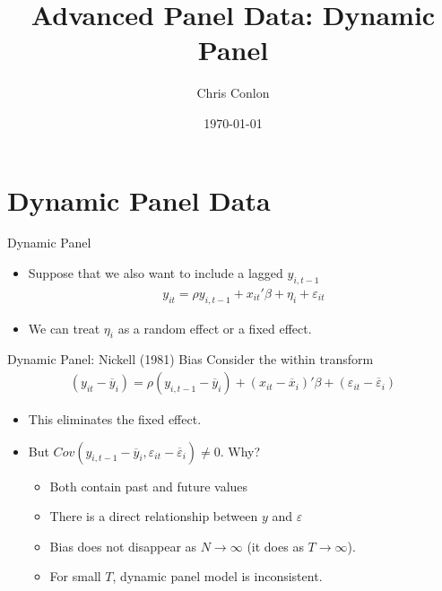 \documentclass[xcolor=pdftex,dvipsnames,table,mathserif,aspectratio=169]{beamer}
\title{Advanced Panel Data: Dynamic Panel}
\author{Chris Conlon }
\institute{NYU Stern }
\date{\today}
\begin{document}
\maketitle




\section*{Dynamic Panel Data}

\begin{frame}{Dynamic Panel}
\begin{itemize}
\item Suppose that we also want to include a lagged $y_{i,t-1}$
\begin{eqnarray*}
y_{it} = \rho y_{i,t-1} + x_{it}'\beta + \eta_i + \varepsilon_{it}
\end{eqnarray*}
\item We can treat $\eta_i$ as a \alert{random effect} or a \alert{fixed effect}.
\end{itemize}
\end{frame}

\begin{frame}{Dynamic Panel: Nickell (1981) Bias}
Consider the within transform
\begin{eqnarray*}
(y_{it}-\overline{y}_i) = \rho (y_{i,t-1}-\overline{y}_i) + (x_{it}-\overline{x}_i)'\beta +( \varepsilon_{it}- \overline{\varepsilon}_{i})
\end{eqnarray*}
\begin{itemize}
\item This eliminates the fixed effect.
\item But $Cov(y_{i,t-1}-\overline{y}_i, \varepsilon_{it}- \overline{\varepsilon}_{i}) \neq0$. Why?
\begin{itemize}
\item Both contain past and future values
\item There is a direct relationship between $y$ and $\varepsilon$
\item Bias does not disappear as $N \rightarrow \infty$ (it does as $T\rightarrow \infty$).
\item For small $T$, dynamic panel model is \alert{inconsistent}.
\end{itemize}
\end{itemize}
\end{frame}
\end{document}
